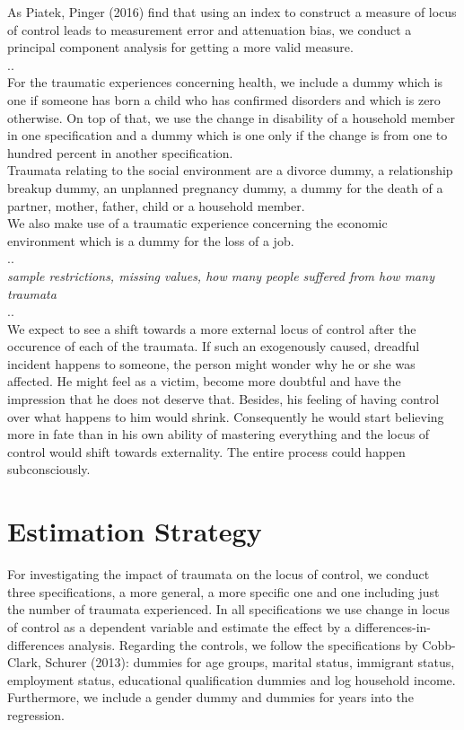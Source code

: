 \documentclass[12pt,a4paper,fleqn]{article}
\begin{document}
As Piatek, Pinger (2016) find that using an index to construct a measure of locus of control leads to measurement error and attenuation bias, we conduct a principal component analysis for getting a more valid measure. \\
..\\
For the traumatic experiences concerning health, we include a dummy which is one if someone has born a child who has confirmed disorders and which is zero otherwise. On top of that, we use the change in disability of a household member in one specification and a dummy which is one only if the change is from one to hundred percent in another specification. \\
Traumata relating to the social environment are a divorce dummy, a relationship breakup dummy, an unplanned pregnancy dummy, a dummy for the death of a partner, mother, father, child or a household member.\\
We also make use of a traumatic experience concerning the economic environment which is a dummy for the loss of a job. \\
..\\
\textit{sample restrictions, missing values, how many people suffered from how many traumata} \\
..\\
We expect to see a shift towards a more external locus of control after the occurence of each of the traumata. If such an exogenously caused, dreadful incident happens to someone, the person might wonder why he or she was affected. He might feel as a victim, become more doubtful and have the impression that he does not deserve that. Besides, his feeling of having control over what happens to him would shrink. Consequently he would start believing more in fate than in his own ability of mastering everything and the locus of control would shift towards externality. The entire process could happen subconsciously. \\

\section{Estimation Strategy}
For investigating the impact of traumata on the locus of control, we conduct three specifications, a more general, a more specific one and one
including just the number of traumata experienced. In all specifications we
use change in locus of control as a dependent variable and estimate the effect by a differences-in-differences analysis.
Regarding the controls, we follow the specifications by Cobb-Clark, Schurer (2013):
dummies for age groups, marital status, immigrant status, employment status,
educational qualification dummies and log household income. Furthermore, we
include a gender dummy and dummies for years into the regression.
\end{document}
